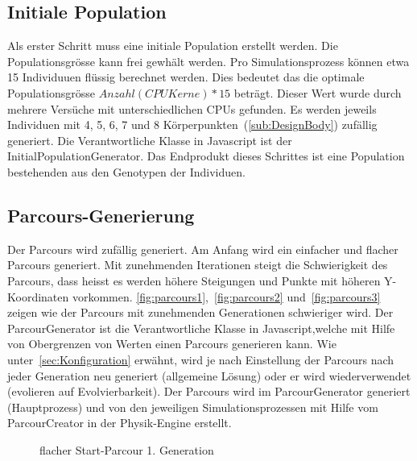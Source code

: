     \subsection{Initiale Population\label{sec:Initiale Polulation}}

      Als erster Schritt muss eine initiale Population erstellt werden. Die Populationsgrösse kann frei gewhält werden.
      Pro Simulationsprozess können etwa 15 Individuuen flüssig berechnet werden.
      Dies bedeutet das die optimale Populationsgrösse  \( Anzahl(CPU Kerne) * 15 \) beträgt.
      Dieser Wert wurde durch mehrere Versüche mit unterschiedlichen CPUs gefunden.
      Es werden jeweils Individuen mit 4, 5, 6, 7 und 8 Körperpunkten~(\vref{sub:DesignBody}) zufällig generiert.
      Die Verantwortliche Klasse in Javascript ist der InitialPopulationGenerator.
      Das Endprodukt dieses Schrittes ist eine Population bestehenden aus den Genotypen der Individuen.

    \subsection{Parcours-Generierung\label{sec:Parcour Generierung}}

      Der Parcours wird zufällig generiert. Am Anfang wird ein einfacher und flacher Parcours generiert.
      Mit zunehmenden Iterationen steigt die Schwierigkeit des Parcours,
      dass heisst es werden höhere Steigungen und Punkte mit höheren Y-Koordinaten vorkommen.
      \vref{fig:parcours1},~\vref{fig:parcours2} und~\vref{fig:parcours3} zeigen wie der Parcours mit zunehmenden Generationen schwieriger wird.
      Der ParcourGenerator ist die Verantwortliche Klasse in Javascript,welche mit Hilfe von Obergrenzen von Werten einen Parcours generieren kann.
      Wie unter~\ref{sec:Konfiguration} erwähnt, wird je nach Einstellung der Parcours nach jeder Generation neu generiert (allgemeine Lösung) oder er wird wiederverwendet (evolieren auf Evolvierbarkeit).
      Der Parcours wird im ParcourGenerator generiert (Hauptprozess) und von den jeweiligen Simulationsprozessen mit Hilfe vom ParcourCreator in der Physik-Engine erstellt.

      \vspace{1cm}

      \begin{figure}[H]
        \centering
        
        \caption{flacher Start-Parcour 1. Generation\label{fig:parcours1}}
      \end{figure}

